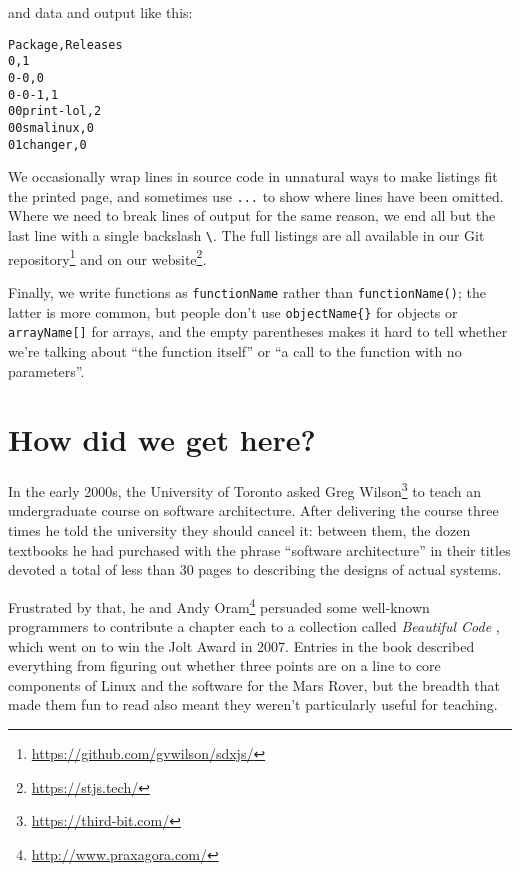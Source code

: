 \documentclass[krantzl]{krantz}
\newcommand{\hreffoot}[2]{{#1}\footnote{\href{#2}{#2}}}
\begin{document}
\noindent and data and output like this:


\begin{lstlisting}[frame=tblr,backgroundcolor=\color{black!5}]
Package,Releases
0,1
0-0,0
0-0-1,1
00print-lol,2
00smalinux,0
01changer,0
\end{lstlisting}



We occasionally wrap lines in source code in unnatural ways to make listings fit the printed page,
and sometimes use \texttt{...} to show where lines have been omitted.
Where we need to break lines of output for the same reason,
we end all but the last line with a single backslash \texttt{{\textbackslash}}.
The full listings are all available in \hreffoot{our Git repository}{https://github.com/gvwilson/sdxjs/}
and \hreffoot{on our website}{https://stjs.tech/}.


Finally,
we write functions as \texttt{functionName} rather than \texttt{functionName()};
the latter is more common,
but people don’t use \texttt{objectName\{\}} for objects or \texttt{arrayName[]} for arrays,
and the empty parentheses makes it hard to tell
whether we’re talking about “the function itself” or “a call to the function with no parameters”.

\section{How did we get here?}\label{introduction-history}


In the early 2000s,
the University of Toronto asked \hreffoot{Greg Wilson}{https://third-bit.com/}
to teach an undergraduate course on software architecture.
After delivering the course three times he told the university they should cancel it:
between them,
the dozen textbooks he had purchased with the phrase “software architecture” in their titles
devoted a total of less than 30 pages to describing the designs of actual systems.


\newpage


Frustrated by that,
he and \hreffoot{Andy Oram}{http://www.praxagora.com/} persuaded some well-known programmers to contribute a chapter each
to a collection called \emph{Beautiful Code} \cite{Oram2007},
which went on to win the Jolt Award in 2007.
Entries in the book described everything from figuring out whether three points are on a line
to core components of Linux
and the software for the Mars Rover,
but the breadth that made them fun to read
also meant they weren’t particularly useful for teaching.
\end{document}
